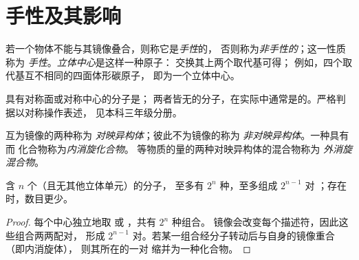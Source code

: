 \section{手性及其影响}

\begin{definition}[立体中心，手性]\label{def:b1:stereochemistry-in-depth:stereocentre}
若一个物体不能与其镜像叠合，则称它是\emph{手性}的，
否则称为\emph{非手性的}；这一性质称为
\emph{手性}。\emph{立体中心}是这样一种原子：
交换其上两个取代基可得；
例如，四个取代基互不相同的四面体形碳原子，
即为一个立体中心。
\end{definition}

具有对称面或对称中心的分子是；
两者皆无的分子，在实际中通常是的。严格判据以对称操作表述，
见本科三年级分册。

\begin{definition}\label{def:b1:stereochemistry-in-depth:enantiomers}
互为镜像的两种称为
\emph{对映异构体}；彼此不为镜像的称为
\emph{非对映异构体}。一种具有而
化合物称为\emph{内消旋化合物}。
等物质的量的两种对映异构体的混合物称为
\emph{外消旋混合物}。
\end{definition}

\begin{proposition}[立体异构体的数目]\label{prop:b1:stereochemistry-in-depth:max-stereoisomers}
含 $n$ 个（且无其他立体单元）的分子，
至多有 $2^n$ 种，至多组成 $2^{n-1}$ 对
；存在时，数目更少。
\end{proposition}

\begin{proof}
每个中心独立地取  或 ，共有 $2^n$ 种组合。
镜像会改变每个描述符，因此这些组合两两配对，
形成 $2^{n-1}$ 对。若某一组合经分子转动后与自身的镜像重合（即内消旋体），
则其所在的一对
缩并为一种化合物。
\end{proof}

